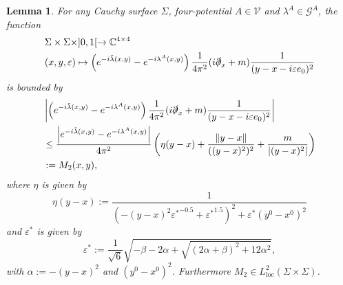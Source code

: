 \documentclass[b5paper,draft,openbib,12pt]{memoir}
\newtheorem{Lemma}[Def]{Lemma}
\begin{document}
\begin{Lemma}\label{lem:bound,ivp2}
For any Cauchy surface \(\Sigma\), four-potential 
\(A\in \mathcal{V}\) and \(\lambda^A\in \mathcal{G}^A\),  
the function 
\begin{align}
&\Sigma\times \Sigma \times ]0,1[\rightarrow \mathbb{C}^{4\times 4}\\
&(x,y,\varepsilon)\mapsto \left(e^{-i\tilde{\lambda}(x,y)}-e^{-i\lambda^A(x,y)}\right) \frac{1}{4\pi^2}(i\slashed{\partial}_x+m)\frac{1}{(y-x-i\varepsilon e_0)^2}
\end{align}
is bounded by
\begin{align}\label{exp exp raw}
&\left|\left(e^{-i\tilde{\lambda}(x,y)}-e^{-i\lambda^A(x,y)}\right) \frac{1}{4\pi^2}(i\slashed{\partial}_x+m)\frac{1}{(y-x-i\varepsilon e_0)^2}\right|  \\
&\le \frac{\left| e^{-i\tilde{\lambda}(x,y)}-e^{-i\lambda^A(x,y)} \right|}{4\pi^2}\left(\eta(y-x)+\frac{\|y-x\|}{((y-x)^2)^2} + \frac{m}{|(y-x)^2|}\right)\label{exp exp term}\\
&:=M_2(x,y),
\end{align}
where \(\eta\) is given by
\begin{equation}
\eta(y-x):=\frac{1}{(-(y-x)^2 {\varepsilon^*}^{-0.5}+{\varepsilon^*}^{1.5})^2+\varepsilon^*(y^0-x^0)^2}
\end{equation}
and \(\varepsilon^*\) is given by
\begin{equation}
\varepsilon^* :=\frac{1}{\sqrt{6}} \sqrt{-\beta-2\alpha + \sqrt{(2\alpha + \beta)^2+12 \alpha^2}},
\end{equation}
with \(\alpha:=-(y-x)^2\) and \((y^0-x^0)^2\).
Furthermore \(M_2\in L^2_{\mathrm{loc}}(\Sigma\times\Sigma)\).
\end{Lemma}
\end{document}
